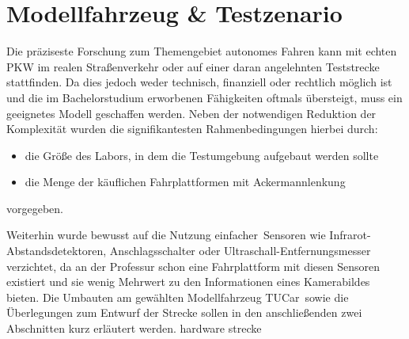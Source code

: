 \chapter{Modellfahrzeug \& Testzenario \dcsecondauthorshort}
Die präziseste Forschung zum Themengebiet autonomes Fahren kann mit echten PKW im realen Straßenverkehr oder auf einer daran angelehnten Teststrecke stattfinden. Da dies jedoch weder technisch, finanziell oder rechtlich möglich ist und die im Bachelorstudium erworbenen Fähigkeiten oftmals übersteigt, muss ein geeignetes Modell geschaffen werden. Neben der notwendigen Reduktion der Komplexität wurden die signifikantesten Rahmenbedingungen hierbei durch:
\begin{itemize}
\item die Größe des Labors, in dem die Testumgebung aufgebaut werden sollte
\item die Menge der käuflichen Fahrplattformen mit Ackermannlenkung
\end{itemize}
vorgegeben. 

Weiterhin wurde bewusst auf die Nutzung \glqq einfacher\grqq\ Sensoren wie Infrarot-Abstandsdetektoren, Anschlagsschalter oder Ultraschall-Entfernungsmesser verzichtet, da an der Professur schon eine Fahrplattform mit diesen Sensoren existiert und sie wenig Mehrwert zu den Informationen eines Kamerabildes bieten. Die Umbauten am gewählten Modellfahrzeug \glqq TUCar\grqq\ sowie die Überlegungen zum Entwurf der Strecke sollen in den anschließenden zwei Abschnitten kurz erläutert werden.
{hardware}
{strecke}

